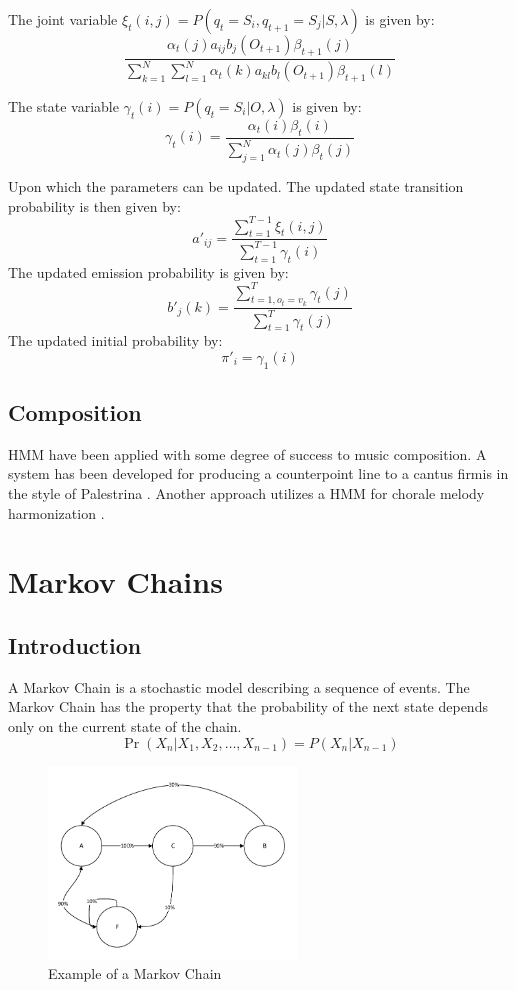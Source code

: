 The joint variable $\xi_t(i,j) = P(q_t = S_i, q_{t+1} = S_j|S, \lambda)$ is given by:
\[ \frac{\alpha_t (j) a_{ij} b_j (O_{t+1}) \beta_{t+1}(j) }{\sum_{k=1}^N \sum_{l=1}^N \alpha_t (k) a_{kl} b_l (O_{t+1}) \beta_{t+1}(l) } \] 

The state variable $\gamma_t(i) = P(q_t = S_i | O, \lambda)$ is given by:
\[ 
\gamma_t(i) = \frac{\alpha_t (i) \beta_t(i)}{\sum_{j=1}^N \alpha_t (j) \beta_t (j)}
\]

Upon which the parameters can be updated. The updated state transition probability is then given by:
\[a'_{ij} = \frac{\sum^{T-1}_{t=1} \xi_t (i,j)}{\sum_{t=1}^{T-1} \gamma_t (i)} \]
The updated emission probability is given by:
\[ b'_j (k) = \frac{\sum^T_{t=1,o_t = v_k} \gamma_t (j)}{\sum^T_{t=1} \gamma_t (j)} \]
The updated initial probability by:
\[ \pi'_i = \gamma_1 (i) \]

\subsection{Composition}
\acs{HMM} have been applied with some degree of success to music composition. A system has been developed for producing a counterpoint line to a cantus firmis in the style of Palestrina \cite{Farbood2001}. Another approach utilizes a \ac{HMM} for chorale melody harmonization \cite{Allan2004}.



\section{Markov Chains} \label{sec:markov_backround}
\subsection{Introduction}
A Markov Chain is a stochastic model describing a sequence of events. The Markov Chain has the property that the probability of the next state depends only on the current state of the chain.
\[ \Pr(X_n | X_1, X_2, \ldots, X_{n-1}) = P(X_n | X_{n-1})  \]

\begin{figure}
\center
\includegraphics[width=250px]{../images/markov_chain_example.pdf}
\caption{Example of a Markov Chain}
\label{ims:markov_chain_example}
\end{figure}

